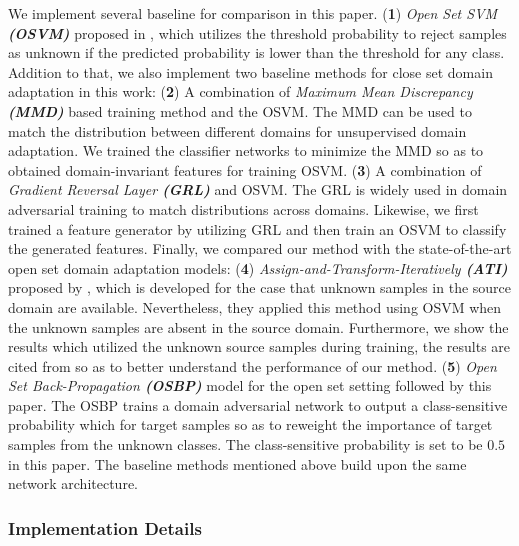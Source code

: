We implement several baseline for comparison in this paper. (\textbf{1}) \textit{Open Set SVM \textbf{(OSVM)}} proposed in \cite{OSVM}, which utilizes the threshold probability to reject samples as unknown if the predicted probability is lower than the threshold for any class. 
Addition to that, we also implement two baseline methods for close set domain adaptation in this work: 
(\textbf{2}) A combination of \textit{Maximum Mean Discrepancy \textbf{(MMD)}} based training method \cite{DeepAdaptationNetworks} and the OSVM. The MMD can be used to match the distribution between different domains for unsupervised domain adaptation. We trained the classifier networks to minimize the MMD so as to obtained domain-invariant features for training OSVM. 
(\textbf{3}) A combination of \textit{Gradient Reversal Layer \textbf{(GRL)}} \cite{DomainAdversrialNetwork} and OSVM. The GRL is widely used in domain adversarial training to match distributions across domains. Likewise, we first trained a feature generator by utilizing GRL and then train an OSVM to classify the generated features. 
Finally, we compared our method with the state-of-the-art open set domain adaptation models: 
(\textbf{4}) \textit{Assign-and-Transform-Iteratively \textbf{(ATI)}} proposed by \cite{OpensetsDA}, which is developed for the case that unknown samples in the source domain are available. Nevertheless, they applied this method using OSVM when the unknown samples are absent in the source domain. Furthermore, we show the results which utilized the unknown source samples during training, the results are cited from \cite{OpensetsDA} so as to better understand the performance of our method.
(\textbf{5}) \textit{Open Set Back-Propagation \textbf{(OSBP)}} model \cite{OpensetDA-bp} for the open set setting followed by this paper. The OSBP trains a domain adversarial network to output a class-sensitive probability which for target samples so as to  reweight the importance of target samples from the unknown classes. The class-sensitive probability is set to be $0.5$ in this paper. 
The baseline methods mentioned above build upon the same network architecture.


\subsubsection{Implementation Details}


